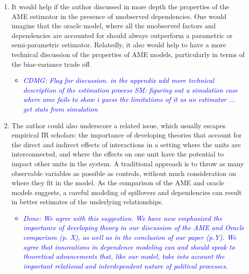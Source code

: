 \begin{enumerate}
\begin{itemize}

		
	\end{itemize}
	\item It would help if the author discussed in more depth the properties of the AME estimator in the presence of unobserved dependencies. One would imagine that the oracle model, where all the unobserved factors and dependencies are accounted for should always outperform a parametric or semi-parametric estimator. Relatedly, it also would help to have a more technical discussion of the properties of AME models, particularly in terms of the bias-variance trade off.
	\begin{itemize}
		\item \textcolor{blue}{ \emph{
		CDMG: Flag for discussion.
		in the appendix add more technical description of the estimation process
		SM: figuring out a simulation case where ame fails to show i guess the limitations of it as an estimator ...
		get stats from simulation
		}}
	\end{itemize}
	\item The author could also underscore a related issue, which usually escapes empirical IR scholars: the importance of developing theories that account for the direct and indirect effects of interactions in a setting where the units are interconnected, and where the effects on one unit have the potential to impact other units in the system. A traditional approach is to throw as many observable variables as possible as controls, without much consideration on where they fit in the model. As the comparison of the AME and oracle models suggests, a careful modeling of spillovers and dependencies can result in better estimates of the underlying relationships.
	\begin{itemize}
		\item \textcolor{blue}{ \emph{
		Done: We agree with this suggestion. We have now emphasized the importance of developing theory in our discussion of the AME and Oracle comparison (p. X), as well as in the conclusion of our paper (p.Y). We agree that innovations in dependence modeling can and should speak to theoretical advancements that, like our model, take into account the important relational and interdependent nature of political processes. 
}}
\end{itemize}
\end{enumerate}

